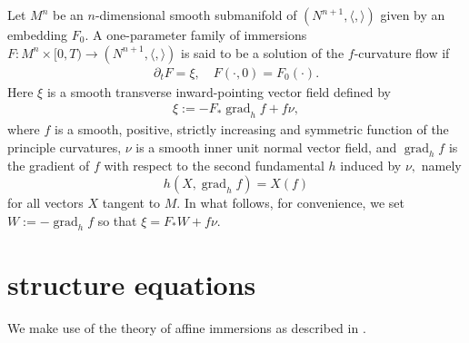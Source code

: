 \documentclass{amsart}
\theoremstyle{definition}
\theoremstyle{remark}
\newcommand{\ip}[2]{\ensuremath{\langle{#1},{#2}\rangle}}
\DeclareMathOperator{\grad}{grad}
\numberwithin{equation}{section}
\begin{document}
\title[]
 {}

\curraddr{}
\email{}
\date{\today}

\dedicatory{}
\subjclass[2010]{}
\keywords{}

\begin{abstract}

\end{abstract}

\maketitle
Let $M^n$ be an $n$-dimensional smooth submanifold of $(N^{n+1},\ip{}{})$ given by an embedding $F_0.$ A one-parameter family of immersions $F\colon M^n\times [0,T)\to (N^{n+1},\ip{}{})$ is said to be a solution of the $f$-curvature flow if
\begin{align}
\partial_tF = \xi,\quad F(\cdot, 0) = F_0(\cdot).
\end{align}
Here $\xi $ is a smooth transverse inward-pointing vector field defined by
\begin{align}
\xi := -F_{\ast}\grad_h f + f\nu,
\end{align}
where $f$ is a smooth, positive, strictly increasing and symmetric function of the principle curvatures, $\nu$ is a smooth inner unit normal vector field, and $\grad_h f$ is the gradient of $f$ with respect to the second fundamental $h$ induced by $\nu,$ namely
\[
h(X, \grad_h f) = X(f)
\]
for all vectors $X$ tangent to $M$. In what follows, for convenience, we set $W := -\grad_h f$ so that $\xi = F_{\ast} W + f \nu$.


\section{structure equations}

We make use of the theory of affine immersions as described in \cite{MR1311248}.
\end{document}
